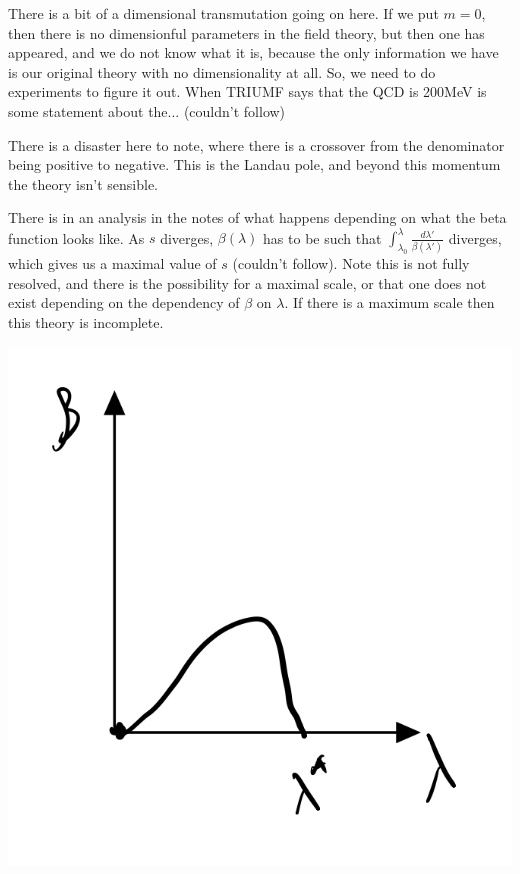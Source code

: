 There is a bit of a dimensional transmutation going on here. If we put $m = 0$, then there is no dimensionful parameters in the field theory, but then one has appeared, and we do not know what it is, because the only information we have is our original theory with no dimensionality at all. So, we need to do experiments to figure it out. When TRIUMF says that the QCD is 200MeV is some statement about the... (couldn't follow)

There is a disaster here to note, where there is a crossover from the denominator being positive to negative. This is the Landau pole, and beyond this momentum the theory isn't sensible.

There is in an analysis in the notes of what happens depending on what the beta function looks like. As $s$ diverges, $\beta(\lambda)$ has to be such that $\int_{\lambda_0}^\lambda \frac{d\lambda'}{\beta(\lambda')}$ diverges, which gives us a maximal value of $s$ (couldn't follow). Note this is not fully resolved, and there is the possibility for a maximal scale, or that one does not exist depending on the dependency of $\beta$ on $\lambda$. If there is a maximum scale then this theory is incomplete.

\begin{center}
    \includegraphics[scale=0.4]{Images/fig-lec30p2.png}
\end{center}

